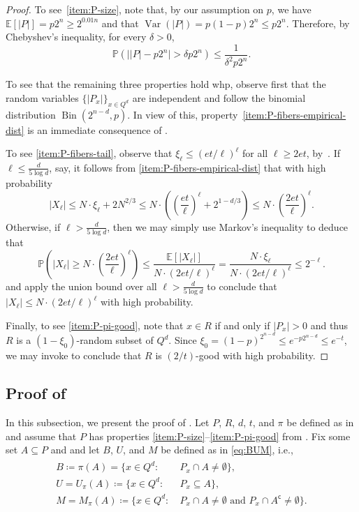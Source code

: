 \documentclass[11pt,a4paper,oneside,reqno]{amsart}
\newcommand{\PP}{\mathbb{P}}
\DeclareMathOperator{\Bin}{Bin}
\DeclareMathOperator{\Var}{Var}
\begin{document}
\begin{proof}
  To see~\ref{item:P-size}, note that, by our assumption on $p$, we have $\mathbb{E}[|P|] = p2^n \geq 2^{0.01n}$ and that $\Var(|P|) = p(1-p)2^n \le p2^n$.
  Therefore, by Chebyshev's inequality, for every $\delta > 0$,
  \[
    \mathbb{P}\left(\bigl||P| - p2^n\bigr| > \delta p2^n\right) \leq \frac{1}{\delta^2p2^n}.
  \]

  To see that the remaining three properties hold whp, observe first that the random variables $\{|P_x|\}_{x \in Q^d}$ are independent and follow the binomial distribution $\Bin(2^{n-d}, p)$.
  In view of this, property~\ref{item:P-fibers-empirical-dist} is an immediate consequence of .

  To see \ref{item:P-fibers-tail}, observe that $\xi_\ell \le (et/\ell)^\ell$ for all $\ell \ge 2et$, by~.
  If $\ell \le \frac{d}{5\log d}$, say, it follows from \ref{item:P-fibers-empirical-dist} that with high probability
  \[
    |X_\ell| \le N \cdot \xi_\ell + 2N^{2/3} \le N \cdot \left(\left(\frac{et}{\ell}\right)^\ell + 2^{1-d/3}\right) \le N \cdot \left(\frac{2et}{\ell}\right)^\ell.
  \]
  Otherwise, if $\ell > \frac{d}{5\log d}$, then we may simply use Markov's inequality to deduce that
  \[
    \PP\left(|X_\ell| \ge N \cdot \left(\frac{2et}{\ell}\right)^\ell\right) \le \frac{\mathbb{E}[|X_\ell|]}{N \cdot (2et/\ell)^\ell} = \frac{N \cdot \xi_\ell}{N \cdot (2et/\ell)^\ell} \le 2^{-\ell}.
  \]
  and apply the union bound over all $\ell > \frac{d}{5\log d}$ to conclude that $|X_\ell| \le N \cdot (2et/\ell)^\ell$ with high probability.

  Finally, to see \ref{item:P-pi-good}, note that $x \in R$ if and only if $|P_x| > 0$ and thus $R$ is a $(1-\xi_0)$-random subset of $Q^d$.  Since $\xi_0 = (1-p)^{2^{n-d}} \le e^{-p2^{n-d}} \le e^{-t}$, we may invoke  to conclude that $R$ is $(2/t)$-good with high probability. 
\end{proof}

\subsection{Proof of }

In this subsection, we present the proof of . Let $P$, $R$, $d$, $t$, and $\pi$ be defined as in  and assume that $P$ has properties \ref{item:P-size}--\ref{item:P-pi-good} from .
Fix some set $A \subseteq P$ and and let $B$, $U$, and $M$ be defined as in \eqref{eq:BUM}, i.e.,
\begin{align*}
  \begin{split}
    B\coloneqq \pi(A)=\{x\in Q^d:\: & P_x \cap A \neq \emptyset\}, \\
    U = U_{\pi}(A)\coloneqq\{x\in Q^d:\: & P_x \subseteq A\}, \\
    M = M_{\pi}(A)\coloneqq\{x\in Q^d:\: & P_x \cap A\neq \emptyset \text{ and } P_x \cap A^\mathsf{c}\neq \emptyset\}.
  \end{split}
\end{align*}
\end{document}

